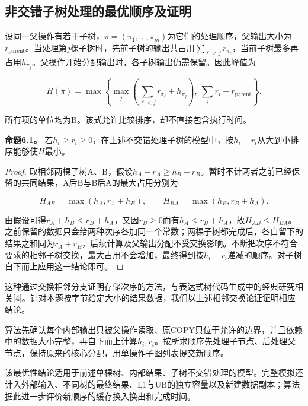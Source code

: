 \documentclass[anonymous,notoc]{gmcm2026}
\begin{document}
\subsection{非交错子树处理的最优顺序及证明}

设同一父操作有若干子树，\(\pi=(\pi_1,\ldots,\pi_m)\)为它们的处理顺序，父输出大小为\(r_{\mathrm{parent}}\)。当处理第\(j\)棵子树时，先前子树的输出共占用\(\sum_{\ell<j}r_{\pi_\ell}\)，当前子树最多再占用\(h_{\pi_j}\)。父操作开始分配输出时，各子树输出仍需保留。因此峰值为

\begin{equation}
H(\pi)=\max\left\{\max_j\left(\sum_{\ell<j}r_{\pi_\ell}+h_{\pi_j}\right),\ \sum_i r_i+r_{\mathrm{parent}}\right\}.
\end{equation}

所有项的单位均为B。该式允许比较排序，却不直接包含执行时间。

\textbf{命题6.1。} 若\(h_i\ge r_i\ge0\)，在上述不交错处理子树的模型中，按\(h_i-r_i\)从大到小排序能够使\(H\)最小。

\begin{proof} 取相邻两棵子树A、B，假设\(h_A-r_A\ge h_B-r_B\)。暂时不计两者之前已经保留的共同结果，A后B与B后A的最大占用分别为

\begin{equation}
H_{AB}=\max(h_A,r_A+h_B),\qquad H_{BA}=\max(h_B,r_B+h_A).
\end{equation}

由假设可得\(r_A+h_B\le r_B+h_A\)，又因\(r_B\ge0\)而有\(h_A\le r_B+h_A\)，故\(H_{AB}\le H_{BA}\)。之前保留的数据只会给两种次序各加同一个常数；两棵子树都完成后，各自留下的结果之和同为\(r_A+r_B\)，后续计算及父输出分配不受交换影响。不断把次序不符合要求的相邻子树交换，最大占用不会增加，最终得到按\(h_i-r_i\)递减的顺序。对子树自下而上应用这一结论即可。\end{proof}

这种通过交换相邻分支证明存储次序的方法，与表达式树代码生成中的经典研究相关{[}4{]}。针对本题按字节给定大小的结果数据，我们以上述相邻交换论证证明相应结论。

算法先确认每个内部输出只被父操作读取、原COPY只位于允许的边界，并且依赖中的数据大小完整，再自下而上计算\(h_i,r_i\)。按所求顺序先处理子节点、后处理父节点，保持原来的核心分配，用单操作子图列表提交新顺序。

该最优性结论适用于前述单棵树、内部结果、子树不交错处理的模型。完整模拟还计入外部输入、不同树的最终结果、L1与UB的独立容量以及新建数据副本；算法据此进一步评价新顺序的缓存换入换出和完成时间。
\end{document}
